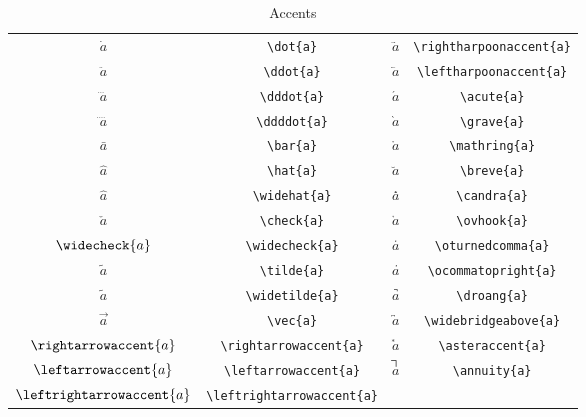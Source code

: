 \documentclass[captions=tableheading]{scrartcl}
\begin{document}
\begin{table}
  \caption{Accents}
  \label{tab:accents}
  \centering
  \begin{tabular}[c]{cc@{\hskip 3em}cc}
    \toprule
    $\dot{a}$ & \verb|\dot{a}| &
    $\rightharpoonaccent{a}$ & \verb|\rightharpoonaccent{a}| \\
    $\ddot{a}$ & \verb|\ddot{a}| &
    $\leftharpoonaccent{a}$ & \verb|\leftharpoonaccent{a}| \\
    $\dddot{a}$ & \verb|\dddot{a}| &
    $\acute{a}$ & \verb|\acute{a}| \\
    $\ddddot{a}$ & \verb|\ddddot{a}| &
    $\grave{a}$ & \verb|\grave{a}| \\
    $\bar{a}$ & \verb|\bar{a}| &
    $\mathring{a}$ & \verb|\mathring{a}| \\
    \addlinespace
    $\hat{a}$ & \verb|\hat{a}| &
    $\breve{a}$ & \verb|\breve{a}| \\
    $\widehat{a}$ & \verb|\widehat{a}| &
    $\candra{a}$ & \verb|\candra{a}| \\
    $\check{a}$ & \verb|\check{a}| &
    $\ovhook{a}$ & \verb|\ovhook{a}| \\
    $\widecheck{a}$ & \verb|\widecheck{a}| &
    $\oturnedcomma{a}$ & \verb|\oturnedcomma{a}| \\
    $\tilde{a}$ & \verb|\tilde{a}| &
    $\ocommatopright{a}$ & \verb|\ocommatopright{a}| \\
    $\widetilde{a}$ & \verb|\widetilde{a}| &
    $\droang{a}$ & \verb|\droang{a}| \\
    \addlinespace
    $\vec{a}$ & \verb|\vec{a}| &
    $\widebridgeabove{a}$ & \verb|\widebridgeabove{a}| \\
    $\rightarrowaccent{a}$ & \verb|\rightarrowaccent{a}| &
    $\asteraccent{a}$ & \verb|\asteraccent{a}| \\
    $\leftarrowaccent{a}$ & \verb|\leftarrowaccent{a}| &
    $\annuity{a}$ & \verb|\annuity{a}| \\
    $\leftrightarrowaccent{a}$ & \verb|\leftrightarrowaccent{a}| &
    & \\
    \bottomrule
  \end{tabular}
\end{table}
\end{document}
